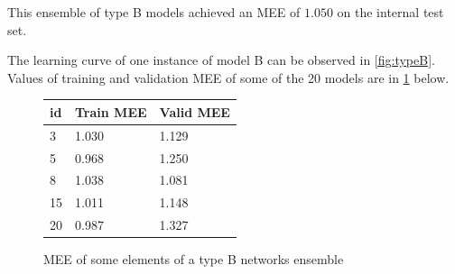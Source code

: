 This ensemble of type B models achieved an MEE of $1.050$ on the internal test set.

The learning curve of one instance of model B can be observed in \cref{fig:typeB}. Values of training and validation MEE of some of the 20 models are in \cref{fig:cup55-table} below.

\begin{figure}
    \centering
    \begin{tabular}{|l|l|l|}
        \hline
        id & Train MEE & Valid MEE \\ \hline
        3 & 1.030 & 1.129 \\ \hline
        5 & 0.968 & 1.250 \\ \hline
        8 & 1.038 & 1.081 \\ \hline
        15 & 1.011 & 1.148 \\ \hline
        20 & 0.987 & 1.327 \\ \hline
    \end{tabular}
    \caption{MEE of some elements of a type B networks ensemble}
    \label{fig:cup55-table}
\end{figure}





